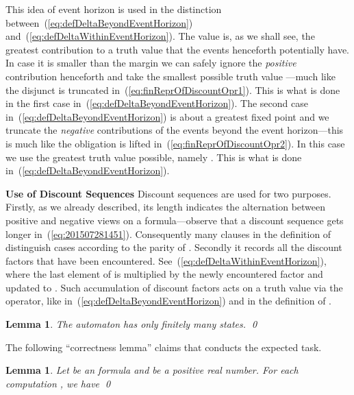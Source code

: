 \documentclass[a4paper,USenglish,numberwithinsect]{lipics}
\theoremstyle{definition}
\theoremstyle{remark}
\theoremstyle{plain}
\newtheorem{lem}[defi]{Lemma}
\begin{document}
This idea of event horizon is used in the distinction
between~(\ref{eq:defDeltaBeyondEventHorizon})
and~(\ref{eq:defDeltaWithinEventHorizon}). The value  is, as we shall see, the greatest contribution
to a truth value that the events henceforth potentially have.  In case it is smaller
than the margin  we can safely ignore the \emph{positive}
contribution henceforth and take
 the smallest possible truth value
---much like the disjunct
 is truncated
in~(\ref{eq:finReprOfDiscountOpr1}). This is what is done in the first case
in~(\ref{eq:defDeltaBeyondEventHorizon}). 
The second case 
in~(\ref{eq:defDeltaBeyondEventHorizon}) is about a greatest fixed point
and
we truncate the \emph{negative} contributions of the events beyond the event
horizon---this is much like the obligation
 is lifted
in~(\ref{eq:finReprOfDiscountOpr2}). In this case we use the greatest truth
value possible, namely . This is what is done
in~(\ref{eq:defDeltaBeyondEventHorizon}).









\noindent 
\textbf{Use of Discount Sequences} \quad
Discount sequences  are used for two purposes. Firstly, as
we already described,
its length
 indicates the alternation between positive and negative views on a
formula---observe that a discount sequence gets longer in~(\ref{eq:201507281451}).  Consequently many clauses in the definition of 
distinguish
cases according to the parity of . Secondly it records all
the discount factors that have been
encountered. See~(\ref{eq:defDeltaWithinEventHorizon}), where the last
element of  is multiplied by the newly encountered factor
 and updated to . 
Such accumulation  of 
discount factors acts on a truth value via the   operator, like
in~(\ref{eq:defDeltaBeyondEventHorizon}) and in the definition of . 





\begin{lem}\label{lem:AphiEpsIsFiniteState}
 The automaton  has only finitely many states.
 \qed
\end{lem}



The following ``correctness lemma'' claims that  
conducts the expected task. 
\begin{lem}\label{lem:correctnessOfA}
  Let  be an  formula and  be a
 positive real number. 
For each computation , we
 have
\qed
\end{lem}
\end{document}
